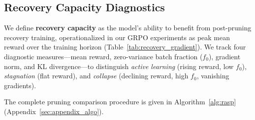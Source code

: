 \subsection{Recovery Capacity Diagnostics}
\label{sec:diagnostics}

We define \textbf{recovery capacity} as the model's ability to benefit from post-pruning recovery training, operationalized in our GRPO experiments as peak mean reward over the training horizon (Table~\ref{tab:recovery_gradient}).
We track four diagnostic measures---mean reward, zero-variance batch fraction ($f_0$), gradient norm, and KL divergence---to distinguish \emph{active learning} (rising reward, low $f_0$), \emph{stagnation} (flat reward), and \emph{collapse} (declining reward, high $f_0$, vanishing gradients).

The complete pruning comparison procedure is given in Algorithm~\ref{alg:rasp} (Appendix~\ref{sec:appendix_algo}).
